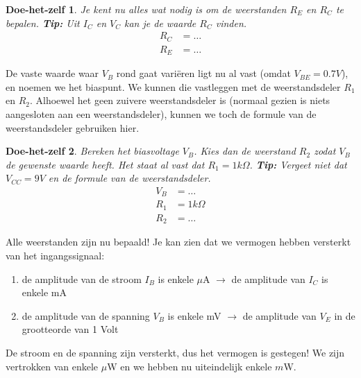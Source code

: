 \documentclass{article}
\newtheorem{DIY}{Doe-het-zelf}
\begin{document}
				\begin{DIY} Je kent nu alles wat nodig is om de weerstanden $R_{E}$ en $ R_{C}$ te bepalen. \textbf{Tip:} Uit $I_C$ en $V_C$ kan je de waarde $R_C$ vinden.
				\begin{align}
				    R_C &= \ldots \\
				    R_E &= \ldots
				\end{align}
				\end{DIY}				

				De vaste waarde waar $V_B$ rond gaat vari\"eren ligt nu al vast (omdat $V_{BE} = 0.7V$), en noemen we het biaspunt. We kunnen die vastleggen met de weerstandsdeler $R_1$ en $R_2$. Alhoewel het geen zuivere weerstandsdeler is (normaal gezien is niets aangesloten aan een weerstandsdeler), kunnen we toch de formule van de weerstandsdeler gebruiken hier.

				\begin{DIY} Bereken het biasvoltage $V_B$. Kies dan de weerstand $R_2$ zodat $V_B$ de gewenste waarde heeft. Het staat al vast dat $R_1 = 1k\Omega$. \textbf{Tip:} Vergeet niet dat $V_{CC} = 9V$ en de formule van de weerstandsdeler.
				\begin{align}
					V_B &= \ldots \\
				    R_1 &= 1k\Omega \\
				    R_2 &= \ldots
				\end{align}
				\end{DIY}

				Alle weerstanden zijn nu bepaald! Je kan zien dat we vermogen hebben versterkt van het ingangssignaal:

				\begin{enumerate}
				 	\item de amplitude van de stroom $I_B$ is enkele $\mu$A $\rightarrow$ de amplitude van $I_C$ is enkele mA
				 	\item de amplitude van de spanning $V_B$ is enkele mV $\rightarrow$ de amplitude van $V_E$ in de grootteorde van 1 Volt
				 \end{enumerate} 

				 De stroom en de spanning zijn  versterkt, dus het vermogen is gestegen! We zijn vertrokken van enkele $\mu$W en we hebben nu uiteindelijk enkele $m$W. 


\end{document}

